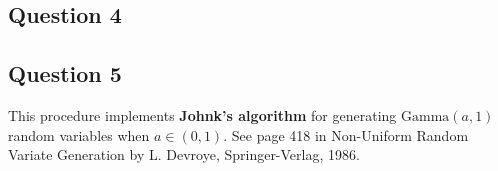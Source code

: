 

\subsection*{Question 4}

\subsection*{Question 5}

This procedure implements \textbf{Johnk's algorithm} for generating $\text{Gamma}(a, 1)$ 
random variables when $a \in (0, 1)$. See page 418 in Non-Uniform Random Variate Generation
by L. Devroye, Springer-Verlag, 1986.

